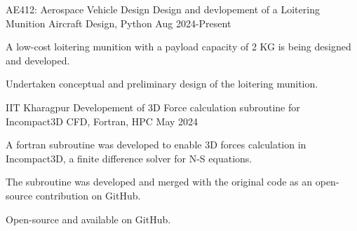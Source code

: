 
\begin{cventries}
  \cventry
  {AE412: Aerospace Vehicle Design} %
  {Design and devlopement of a Loitering Munition} %
  {Aircraft Design, Python} %
  {Aug 2024-Present} %
  {
    \begin{cvitems} %
      \item {A low-cost loitering munition with a payload capacity of 2 KG is being designed and developed.}
      \item {Undertaken conceptual and preliminary design of the loitering munition.}
    \end{cvitems}
  }

  \cventry
  {IIT Kharagpur} %
  {Developement of 3D Force calculation subroutine for Incompact3D} %
  {CFD, Fortran, HPC} %
  {May 2024} %
  {
    \begin{cvitems} %
      \item {A fortran subroutine was developed to enable 3D forces calculation in Incompact3D, a finite difference solver for N-S equations.}
      \item {The subroutine was developed and merged with the original code as an open-source contribution on GitHub.}
      \item {Open-source and available on GitHub.}
    \end{cvitems}
  }


\end{cventries}
